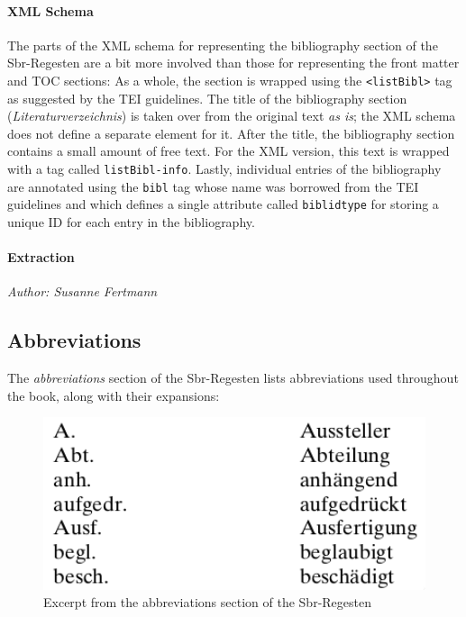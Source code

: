 \paragraph{XML Schema}

The parts of the XML schema for representing the bibliography section
of the Sbr-Regesten are a bit more involved than those for
representing the front matter and TOC sections: As a whole, the
section is wrapped using the \texttt{<listBibl>} tag as suggested by
the TEI guidelines. The title of the bibliography section
(\emph{Literaturverzeichnis}) is taken over from the original text
\emph{as is}; the XML schema does not define a separate element for
it. After the title, the bibliography section contains a small amount
of free text. For the XML version, this text is wrapped with a tag
called \texttt{listBibl-info}. Lastly, individual entries of the
bibliography are annotated using the \texttt{bibl} tag whose name was
borrowed from the TEI guidelines and which defines a single attribute
called \texttt{biblidtype} for storing a unique ID for each entry in
the bibliography.

\paragraph{Extraction}

\emph{Author: Susanne Fertmann} \\

\subsection{Abbreviations}
\label{sec:abbrevs}

The \emph{abbreviations} section of the Sbr-Regesten lists
abbreviations used throughout the book, along with their expansions:

\begin{figure}[h]
  \centering
  \includegraphics[width=1.0\textwidth]{img/abbrevs}
  \caption{Excerpt from the abbreviations section of the Sbr-Regesten}
  \label{fig:abbrevs}
\end{figure}

